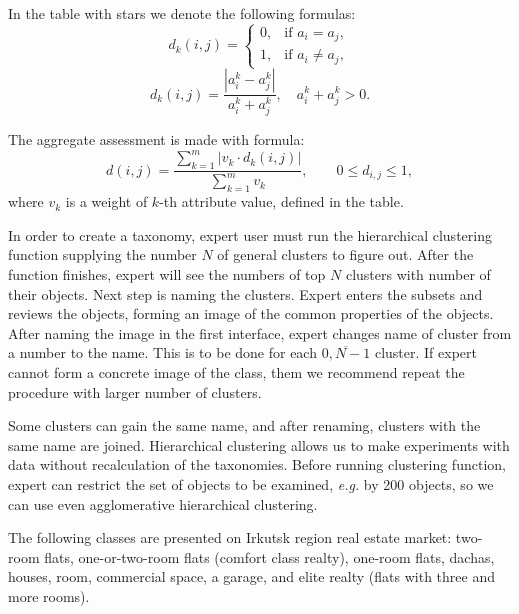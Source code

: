 \documentclass[conference]{IEEEtran}
\begin{document}
In the table with stars we denote the following formulas:
\[
  d_k(i,j) = \left\{
                                                          \begin{array}{ll}
                                                            0, & \mbox{if\ \ } a_i=a_j,\\
                                                            1, & \mbox{if\ \ } a_i\neq a_j,
                                                          \end{array}
                                                          \right.
  \tag{\star}
\]
\[
  d_k(i,j) = \frac{|a_i^k-a_j^k|}{a_i^k+a_j^k},\quad a_i^k+a_j^k>0.
  \tag{\star\star}
\]

The aggregate assessment is made with formula:
\[
  d(i,j)=\frac{\sum\limits_{k=1}^m|v_k\cdot d_k(i,j)|}{\sum\limits_{k=1}^m v_k}, \qquad 0\leqslant d_{i,j}\leqslant 1,
\]
\noindent where $v_k$ is a weight of $k$-th attribute value, defined in the table. %

In order to create a taxonomy, expert user must run the hierarchical clustering function supplying the number $N$ of general clusters to figure out.  After the function finishes, expert will see the numbers of top $N$ clusters with number of their objects.  Next step is naming the clusters.  Expert enters the subsets and reviews the objects, forming an image of the common properties of the objects.  After naming the image in the first interface, expert changes name of cluster from a number to the name.  This is to be done for each $\overline{0,N-1}$ cluster.  If expert cannot form a concrete image of the class, them we recommend repeat the procedure with larger number of clusters.

Some clusters can gain the same name, and after renaming, clusters with the same name are joined.  Hierarchical clustering allows us to make experiments with data without recalculation of the taxonomies.  Before running clustering function, expert can restrict the set of objects to be examined, \emph{e.g.} by 200 objects, so we can use even agglomerative hierarchical clustering.

The following classes are presented on Irkutsk region real estate market: two-room flats, one-or-two-room flats (comfort class realty), one-room flats, dachas, houses, room, commercial space, a garage, and elite realty (flats with three and more rooms).
\end{document}
